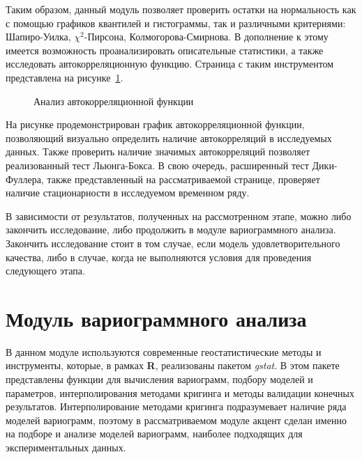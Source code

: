 Таким образом, данный модуль позволяет проверить остатки на нормальность как с помощью графиков квантилей и гистограммы, так и различными критериями: Шапиро-Уилка, $ \chi^2 $-Пирсона, Колмогорова-Смирнова. В дополнение к этому имеется возможность проанализировать описательные статистики, а также исследовать автокорреляционную функцию. Страница с таким инструментом представлена на рисунке~\ref{img:mod_acf}.
\begin{figure}[ht]
\caption{Анализ автокорреляционной функции}
\label{img:mod_acf}
\end{figure}
На рисунке продемонстрирован график автокорреляционной функции, позволяющий визуально определить наличие автокорреляций в исследуемых данных. Также проверить наличие значимых автокорреляций позволяет реализованный тест Льюнга-Бокса. В свою очередь, расширенный тест Дики-Фуллера, также представленный на рассматриваемой странице, проверяет наличие стационарности в исследуемом временном ряду.

В зависимости от результатов, полученных на рассмотренном этапе, можно либо закончить исследование, либо продолжить в модуле вариограммного анализа. Закончить исследование стоит в том случае, если модель удовлетворительного качества, либо в случае, когда не выполняются условия для проведения следующего этапа.


\section{Модуль вариограммного анализа} %
\label{sec:mod_variogram}

В данном модуле используются современные геостатистические методы и инструменты, которые, в рамках \textbf{R}, реализованы пакетом \textit{gstat}. В этом пакете представлены функции для вычисления вариограмм, подбору моделей и параметров, интерполирования методами кригинга и методы валидации конечных результатов. Интерполирование методами кригинга подразумевает наличие ряда моделей вариограмм, поэтому в рассматриваемом модуле акцент сделан именно на подборе и анализе моделей вариограмм, наиболее подходящих для экспериментальных данных.

